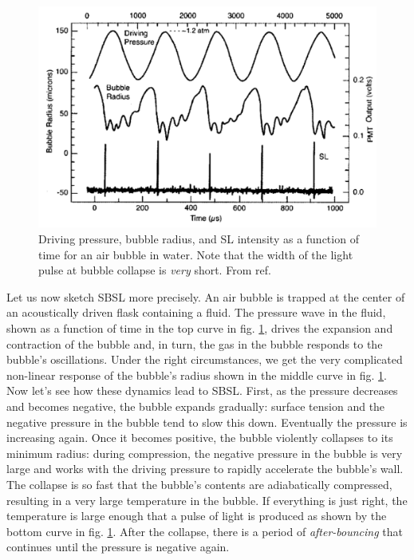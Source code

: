 \documentclass[11pt,prb,aps,nofootinbib,superscriptaddress,floatfix]{revtex4-2}
\begin{document}

\begin{figure}
\includegraphics[width=0.7\linewidth]{figs/pulses}
    \caption{Driving pressure, bubble radius, and SL intensity as a function of time for an air bubble in water. Note that the width of the light pulse at bubble collapse is \emph{very} short. From ref. \cite{crum1994sonoluminescence}}
\label{fig:pulses}
\end{figure}

Let us now sketch SBSL more precisely. An air bubble is trapped at the center of an acoustically driven flask containing a fluid. The pressure wave in the fluid, shown as a function of time in the top curve in fig. \ref{fig:pulses}, drives the expansion and contraction of the bubble and, in turn, the gas in the bubble responds to the bubble's oscillations. Under the right circumstances, we get the very complicated non-linear response of the bubble's radius shown in the middle curve in fig. \ref{fig:pulses}. Now let's see how these dynamics lead to SBSL. First, as the pressure decreases and becomes negative, the bubble expands gradually: surface tension and the negative pressure in the bubble tend to slow this down. Eventually the pressure is increasing again. Once it becomes positive, the bubble violently collapses to its minimum radius: during compression, the negative pressure in the bubble is very large and works with the driving pressure to rapidly accelerate the bubble's wall. The collapse is so fast that the bubble's contents are adiabatically compressed, resulting in a very large temperature in the bubble. If everything is just right, the temperature is large enough that a pulse of light is produced as shown by the bottom curve in fig. \ref{fig:pulses}. After the collapse, there is a period of \emph{after-bouncing} that continues until the pressure is negative again. 
\end{document}
